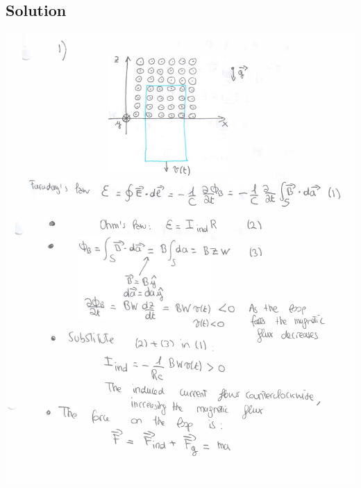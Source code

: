 \documentclass[solutions]{esg8022pset}
\begin{document}
\subsection{Solution}
  \begin{center}
    \includegraphics[width = \textwidth, height = 0.9\textheight, keepaspectratio]{ps9_1a}
    \clearpage

\end{center}
\end{document}
